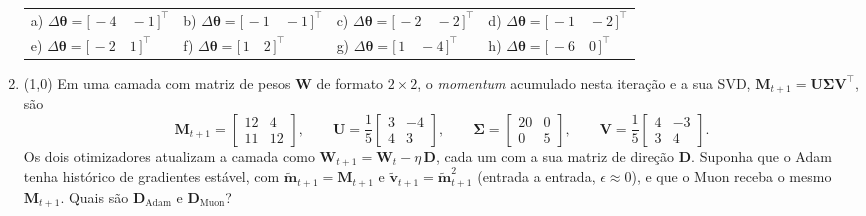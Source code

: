 \documentclass[11pt,a4paper]{article}
\begin{document}
\begin{enumerate}[1)]
\begin{center}
\begin{tabular}{@{}llll@{}}
a) $\Delta\boldsymbol{\theta} = \bigl[\,-4 \quad -1\,\bigr]^{\top}$ & b) $\Delta\boldsymbol{\theta} = \bigl[\,-1 \quad -1\,\bigr]^{\top}$ & c) $\Delta\boldsymbol{\theta} = \bigl[\,-2 \quad -2\,\bigr]^{\top}$ & d) $\Delta\boldsymbol{\theta} = \bigl[\,-1 \quad -2\,\bigr]^{\top}$ \\[0.3em]
e) $\Delta\boldsymbol{\theta} = \bigl[\,-2 \quad 1\,\bigr]^{\top}$ & f) $\Delta\boldsymbol{\theta} = \bigl[\,1 \quad 2\,\bigr]^{\top}$ & g) $\Delta\boldsymbol{\theta} = \bigl[\,1 \quad -4\,\bigr]^{\top}$ & h) $\Delta\boldsymbol{\theta} = \bigl[\,-6 \quad 0\,\bigr]^{\top}$ \\
\end{tabular}
\end{center}

\item (1{,}0) Em uma camada com matriz de pesos $\mathbf{W}$ de formato $2 \times 2$, o \textit{momentum} acumulado nesta iteração e a sua SVD, $\mathbf{M}_{t+1} = \mathbf{U}\boldsymbol{\Sigma}\mathbf{V}^{\top}$, são
\[
\mathbf{M}_{t+1} = \begin{bmatrix} 12 & 4 \\ 11 & 12 \end{bmatrix}, \qquad
\mathbf{U} = \frac{1}{5}\begin{bmatrix} 3 & -4 \\ 4 & 3 \end{bmatrix}, \qquad
\boldsymbol{\Sigma} = \begin{bmatrix} 20 & 0 \\ 0 & 5 \end{bmatrix}, \qquad
\mathbf{V} = \frac{1}{5}\begin{bmatrix} 4 & -3 \\ 3 & 4 \end{bmatrix}.
\]
Os dois otimizadores atualizam a camada como $\mathbf{W}_{t+1} = \mathbf{W}_t - \eta\,\mathbf{D}$, cada um com a sua matriz de direção $\mathbf{D}$. Suponha que o Adam tenha histórico de gradientes estável, com $\widetilde{\mathbf{m}}_{t+1} = \mathbf{M}_{t+1}$ e $\widetilde{\mathbf{v}}_{t+1} = \widetilde{\mathbf{m}}_{t+1}^{2}$ (entrada a entrada, $\epsilon \approx 0$), e que o Muon receba o mesmo $\mathbf{M}_{t+1}$. Quais são $\mathbf{D}_{\text{Adam}}$ e $\mathbf{D}_{\text{Muon}}$?


\end{enumerate}
\end{document}
